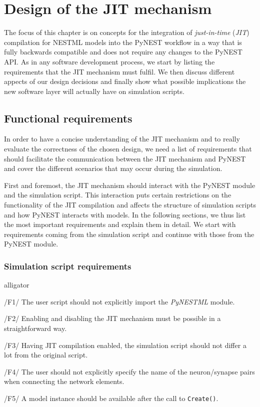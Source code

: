 
\chapter{Design of the JIT mechanism}
\label{chap:jit}

The focus of this chapter is on concepts for the integration of \emph{just-in-time} (\emph{JIT}) compilation for NESTML models into the PyNEST workflow in a way that is fully backwards compatible and does not require any changes to the PyNEST API. As in any software development process, we start by listing the requirements that the JIT mechanism must fulfil. We then discuss different appects of our design decisions and finally show what possible implications the new software layer will actually have on simulation scripts.

\section{Functional requirements}

In order to have a concise understanding of the JIT mechanism and to really evaluate the correctness of the chosen design, we need a list of requirements that should facilitate the communication between the JIT mechanism and PyNEST and cover the different scenarios that may occur during the simulation.

First and foremost, the JIT mechanism should interact with the PyNEST module and the simulation script. This interaction puts certain restrictions on the functionality of the JIT compilation and affects the structure of simulation scripts and how PyNEST interacts with models. In the following sections, we thus list the most important requirements and explain them in detail. We start with requirements coming from the simulation script and continue with those from the PyNEST module.

\subsection*{Simulation script requirements}

\begin{labeling}{alligator}
   \item[/F1/] The user script should not explicitly import the \emph{PyNESTML} module.
   \item[/F2/] Enabling and disabling the JIT mechanism must be possible in a straightforward way.
   \item[/F3/] Having JIT compilation enabled, the simulation script should not differ a lot from the original script.
   \item[/F4/]\label{req:F4} The user should not explicitly specify the name of the neuron/synapse pairs when connecting the network elements.
   \item[/F5/] A model instance should be available after the call to \texttt{Create()}.
\end{labeling}

